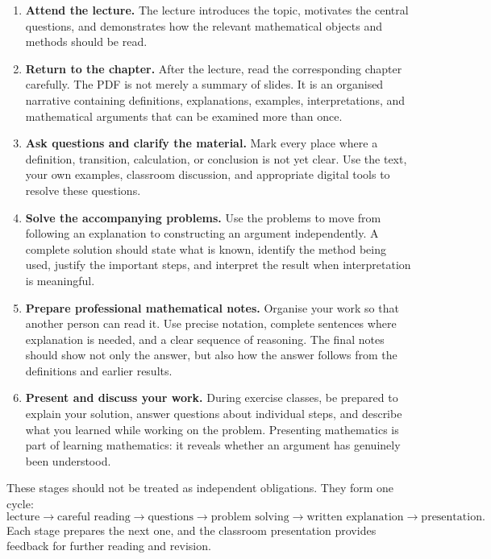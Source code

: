 \begin{enumerate}
    \item \textbf{Attend the lecture.}
    The lecture introduces the topic, motivates the central questions, and
    demonstrates how the relevant mathematical objects and methods should be
    read.

    \item \textbf{Return to the chapter.}
    After the lecture, read the corresponding chapter carefully. The PDF is
    not merely a summary of slides. It is an organised narrative containing
    definitions, explanations, examples, interpretations, and mathematical
    arguments that can be examined more than once.

    \item \textbf{Ask questions and clarify the material.}
    Mark every place where a definition, transition, calculation, or conclusion
    is not yet clear. Use the text, your own examples, classroom discussion,
    and appropriate digital tools to resolve these questions.

    \item \textbf{Solve the accompanying problems.}
    Use the problems to move from following an explanation to constructing an
    argument independently. A complete solution should state what is known,
    identify the method being used, justify the important steps, and interpret
    the result when interpretation is meaningful.

    \item \textbf{Prepare professional mathematical notes.}
    Organise your work so that another person can read it. Use precise notation,
    complete sentences where explanation is needed, and a clear sequence of
    reasoning. The final notes should show not only the answer, but also how the
    answer follows from the definitions and earlier results.

    \item \textbf{Present and discuss your work.}
    During exercise classes, be prepared to explain your solution, answer
    questions about individual steps, and describe what you learned while
    working on the problem. Presenting mathematics is part of learning
    mathematics: it reveals whether an argument has genuinely been understood.
\end{enumerate}

These stages should not be treated as independent obligations. They form one
cycle:
\[
\text{lecture}
\longrightarrow
\text{careful reading}
\longrightarrow
\text{questions}
\longrightarrow
\text{problem solving}
\longrightarrow
\text{written explanation}
\longrightarrow
\text{presentation}.
\]
Each stage prepares the next one, and the classroom presentation provides
feedback for further reading and revision.


